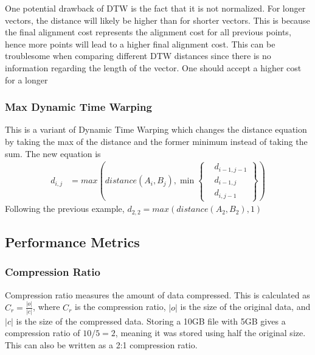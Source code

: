 One potential drawback of DTW is the fact that it is not normalized. For longer vectors, the distance will likely be higher than for shorter vectors. This is because the final alignment cost represents the alignment cost for all previous points, hence more points will lead to a higher final alignment cost. This can be troublesome when comparing different DTW distances since there is no information regarding the length of the vector. One should accept a higher cost for a longer



\subsubsection{Max Dynamic Time Warping}
This is a variant of Dynamic Time Warping which changes the distance equation by taking the max of the distance and the former minimum instead of taking the sum. The new equation is \begin{equation}
    \label{eq:max_dtw}
    \begin{aligned}
        d_{i, j} & = max(distance(A_{i}, B_{j}), \min \left\{ \begin{aligned}
                                                                   & d_{i-1, j-1} \\
                                                                   & d_{i-1, j}   \\
                                                                   & d_{i, j-1}
                                                              \end{aligned} \right\})
    \end{aligned}
\end{equation}
Following the previous example, $d_{2, 2} = max(distance(A_{2}, B_{2}), 1)$




\subsection{Performance Metrics}
\subsubsection{Compression Ratio}
Compression ratio measures the amount of data compressed. This is calculated as $C_{r} = \frac{|o|}{|c|}$, where $C_{r}$ is the compression ratio, $|o|$ is the size of the original data, and $|c|$ is the size of the compressed data. Storing a 10GB file with 5GB gives a compression ratio of $10 / 5 = 2$, meaning it was stored using half the original size. This can also be written as a 2:1 compression ratio.

